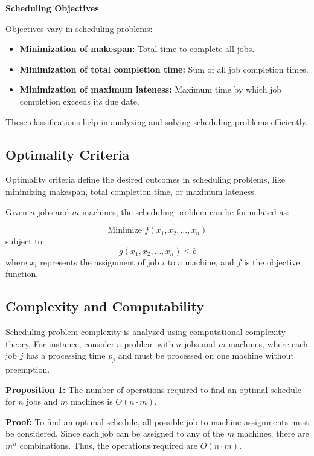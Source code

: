\documentclass[12pt]{book} %
\begin{document}
\textbf{Scheduling Objectives}

Objectives vary in scheduling problems:

\begin{itemize}
    \item \textbf{Minimization of makespan:} Total time to complete all jobs.
    \item \textbf{Minimization of total completion time:} Sum of all job completion times.
    \item \textbf{Minimization of maximum lateness:} Maximum time by which job completion exceeds its due date.
\end{itemize}

These classifications help in analyzing and solving scheduling problems efficiently.

\subsection{Optimality Criteria}

Optimality criteria define the desired outcomes in scheduling problems, like minimizing makespan, total completion time, or maximum lateness.

Given \(n\) jobs and \(m\) machines, the scheduling problem can be formulated as:

\[
\text{Minimize } f(x_1, x_2, \ldots, x_n)
\]
subject to:
\[
g(x_1, x_2, \ldots, x_n) \leq b
\]
where \(x_i\) represents the assignment of job \(i\) to a machine, and \(f\) is the objective function.

\subsection{Complexity and Computability}

Scheduling problem complexity is analyzed using computational complexity theory. For instance, consider a problem with \(n\) jobs and \(m\) machines, where each job \(j\) has a processing time \(p_j\) and must be processed on one machine without preemption.

\textbf{Proposition 1:} The number of operations required to find an optimal schedule for \(n\) jobs and \(m\) machines is \(O(n \cdot m)\).

\textbf{Proof:} 
To find an optimal schedule, all possible job-to-machine assignments must be considered. Since each job can be assigned to any of the \(m\) machines, there are \(m^n\) combinations. Thus, the operations required are \(O(n \cdot m)\).
\end{document}

